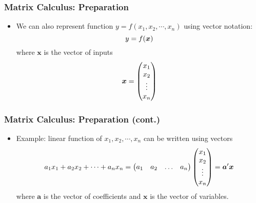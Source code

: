 \documentclass[pdflatex, 12pt]{beamer}
\begin{document}
\begin{frame}
\frametitle{Matrix Calculus: Preparation}
\begin{itemize}
\item We can also represent function $y = f(x_1, x_2, \cdots, x_n)$ using vector notation:
 \begin{equation}
 y = f(\bm{x}) \notag
 \end{equation}
where $\bm{x}$ is the vector of inputs
 \begin{equation}
 \bm{x} = \begin{pmatrix}
 x_1 \\
 x_2 \\
 \vdots \\
 x_n \\
 \end{pmatrix} \notag 
 \end{equation}
\end{itemize}
\end{frame}

\begin{frame}
\frametitle{Matrix Calculus: Preparation (cont.)}
\begin{itemize}
\item Example: linear function of $x_1, x_2, \cdots, x_n$ can be written using vectors
 \begin{equation}
 a_1 x_1 + a_2 x_2 + \cdots + a_n x_n = \begin{pmatrix}
 a_1 & a_2 & \ldots & a_n
 \end{pmatrix} \begin{pmatrix}
 x_1 \\
 x_2 \\
 \vdots \\
 x_n \\
 \end{pmatrix} = \bm{a}'\bm{x} \notag
 \end{equation}
where $\bm{a}$ is the vector of coefficients and $\bm{x}$ is the vector of variables.
\end{itemize}
\end{frame}
\end{document}
